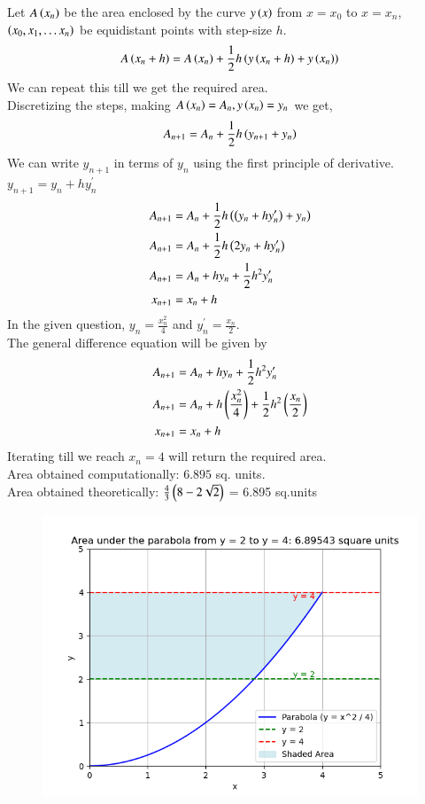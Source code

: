 \documentclass[journal]{IEEEtran}
\begin{document}
Let $A\left(x_n\right)$ be the area enclosed by the curve $y\left(x\right)$ from $x = x_0$ to $x = x_n$, $\left(x_0, x_1, \dots x_n\right)$ be equidistant points with step-size $h$.
\begin{align}
  A\left(x_n+h\right) = A\left(x_n\right)+\frac{1}{2}h\left(y\left(x_n+h\right)+y\left(x_n\right)\right)
\end{align}
We can repeat this till we get the required area.\\
Discretizing the steps, making $A\left(x_n\right) = A_n, y\left(x_n\right) = y_n$ we get,
\begin{align}
 A_{n+1} = A_n+\frac{1}{2}h\left(y_{n+1}+y_n\right)
\end{align}
We can write $y_{n+1}$ in terms of $y_n$ using the first principle of derivative. $y_{n+1} = y_n + hy^{\prime}_n$
\begin{align}
  A_{n+1} &= A_n+\frac{1}{2}h\left(\left(y_{n}+hy^{\prime}_n\right)+y_n\right)\\
  A_{n+1} &= A_n+\frac{1}{2}h\left(2y_n+hy^{\prime}_n\right)\\
  A_{n+1} &= A_n+hy_n+\frac{1}{2}h^2y^{\prime}_n\\
  x_{n+1} &= x_n+h
\end{align}
In the given question, $y_n = \frac{x_n^2}{4}$ and $y^{\prime}_n = \frac{x_n}{2}$. \\
The general difference equation will be given by
\begin{align}
  A_{n+1} &= A_n+hy_n+\frac{1}{2}h^2y^{\prime}_n\\
  A_{n+1} &= A_n+h\left(\frac{x_n^2}{4}\right)+\frac{1}{2}h^2\left(\frac{x_n}{2}\right)\\
  x_{n+1} &= x_n+h
\end{align}
Iterating till we reach $x_n = 4$ will return the required area. \\

Area obtained computationally: $6.895$ sq. units.\\

Area obtained theoretically: $\frac{4}{3} \left(8 - 2\sqrt{2}\right)$ = 6.895 sq.units\\
\begin{figure}[ht!]
   \centering
   \includegraphics[width=\columnwidth]{figs/Figure_1.png}
\end{figure}
\end{document}
